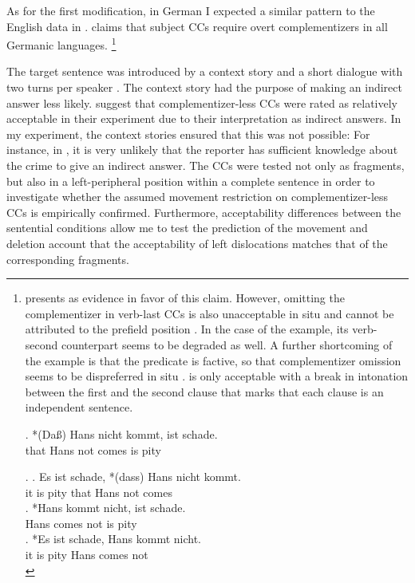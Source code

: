 As for the first modification, in German I expected a similar pattern to the English data in \citet{merchant.etal2013}. \citet[83]{webelhuth1992} claims that subject CCs require overt complementizers in all Germanic languages.%
%
\footnote{\citeauthor{webelhuth1992} presents \Next as evidence in favor of this claim. However, omitting the complementizer in verb-last CCs is also unacceptable in situ and cannot be attributed to the prefield position \NNext[a]. In the case of the example, its verb-second counterpart \NNext[b] seems to be degraded as well. A further shortcoming of the example is that the predicate is factive, so that complementizer omission seems to be dispreferred in situ \NNext[c]. \NNext[c] is only acceptable with a break in intonation between the first and the second clause that marks that each clause is an independent sentence.

\exg. *(Da\ss) Hans nicht kommt, ist schade.\\
that Hans not comes is pity\\

\ex. \ag. Es ist schade, *(dass) Hans nicht kommt.\\
	  it is pity that Hans not comes\\
     \bg. *Hans kommt nicht, ist schade.\\
	  Hans comes not is pity\\
    \cg.  *Es ist schade, Hans kommt nicht.\\
	  it is  pity Hans comes not\\


}\afterfn %

The target sentence was introduced by a context story and a short dialogue with two turns per speaker \Next. The context story had the purpose of making an indirect answer less likely. \citet{merchant.etal2013} suggest that complementizer-less CCs were rated as relatively acceptable in their experiment due to their interpretation as indirect answers. In my experiment, the context stories ensured that this was not possible: For instance, in \Next, it is very unlikely that the reporter has sufficient knowledge about the crime to give an indirect answer. The CCs were tested not only as fragments, but also in a left-peripheral position within a complete sentence in order to investigate whether the assumed movement restriction on complementizer-less CCs is empirically confirmed. Furthermore, acceptability differences between the sentential conditions allow me to test the prediction of the movement and deletion account that the acceptability of left dislocations matches that of the corresponding fragments.

